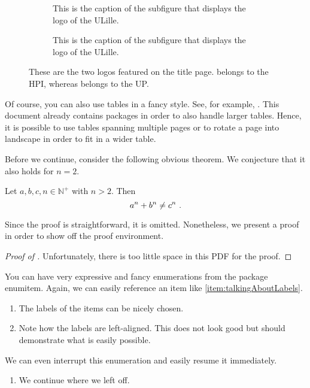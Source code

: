 \begin{figure}
    \centering
    \begin{subfigure}[b]{0.45\textwidth}
        \centering
        \def\svgwidth{0.90\textwidth}
        

        \caption{This is the caption of the subfigure that displays the logo of the ULille.}
        \label{fig:HPI}
    \end{subfigure}
    \hfil
    \begin{subfigure}[b]{0.45\textwidth}
        \centering
        \def\svgwidth{0.90\textwidth}
        

        \caption{This is the caption of the subfigure that displays the logo of the ULille.}
        \label{fig:UP}
    \end{subfigure}
    \caption{These are the two logos featured on the title page.  belongs to the HPI, whereas  belongs to the UP.}
    \label{fig:logos}
\end{figure}

Of course, you can also use tables in a fancy style. See, for example, . This document already contains packages in order to also handle larger tables. Hence, it is possible to use tables spanning multiple pages or to rotate a page into landscape in order to fit in a wider table.

Before we continue, consider the following obvious theorem. We conjecture that it also holds for $n = 2$.
\begin{theorem}
    \label{thm:fermatsTheorem}
    Let $a, b, c, n \in \mathds{N}^+$ with $n > 2$. Then
    \[
        a^n + b^n \neq c^n\ .\qedhere
    \]
\end{theorem}

Since the proof is straightforward, it is omitted. Nonetheless, we present a proof in order to show off the proof environment.

\begin{proof}[Proof of ]
    Unfortunately, there is too little space in this PDF for the proof.
\end{proof}

You can have very expressive and fancy enumerations from the package \textsf{enumitem}. Again, we can easily reference an item like \cref{item:talkingAboutLabels}.
\begin{enumerate}[label = (\roman*), align = left, labelwidth = 2 em, labelsep = 0 em]
    \item The labels of the items can be nicely chosen.\label{item:talkingAboutLabels}
    
    \item Note how the labels are left-aligned. This does not look good but should demonstrate what is easily possible.
\end{enumerate}
We can even interrupt this enumeration and easily resume it immediately.
\begin{enumerate}[resume*]
    \item We continue where we left off.
\end{enumerate}

